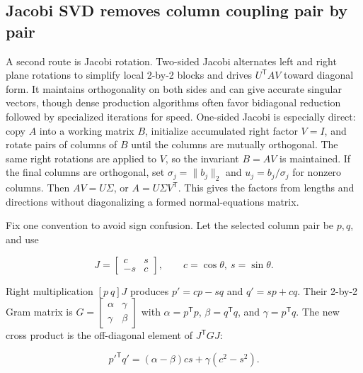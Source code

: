 \subsection{Jacobi SVD removes column coupling pair by pair}\label{jacobi-svd-removes-column-coupling-pair-by-pair}

A second route is Jacobi rotation. Two-sided Jacobi alternates left and right plane rotations to simplify local 2-by-2 blocks and drives \(U^\mathsf TAV\) toward diagonal form. It maintains orthogonality on both sides and can give accurate singular vectors, though dense production algorithms often favor bidiagonal reduction followed by specialized iterations for speed. One-sided Jacobi is especially direct: copy \(A\) into a working matrix \(B\), initialize accumulated right factor \(V=I\), and rotate pairs of columns of \(B\) until the columns are mutually orthogonal. The same right rotations are applied to \(V\), so the invariant \(B=AV\) is maintained. If the final columns are orthogonal, set \(\sigma_j=\|b_j\|_2\) and \(u_j=b_j/\sigma_j\) for nonzero columns. Then \(AV=U\Sigma\), or \(A=U\Sigma V^\mathsf T\). This gives the factors from lengths and directions without diagonalizing a formed normal-equations matrix.

Fix one convention to avoid sign confusion. Let the selected column pair be \(p,q\), and use

\[
J=\begin{bmatrix}c&s\\-s&c\end{bmatrix},\qquad c=\cos\theta,\ s=\sin\theta.
\]

Right multiplication \([p\ q]J\) produces \(p'=cp-sq\) and \(q'=sp+cq\). Their 2-by-2 Gram matrix is \(G=\begin{bmatrix}\alpha&\gamma\\\gamma&\beta\end{bmatrix}\) with \(\alpha=p^\mathsf Tp\), \(\beta=q^\mathsf Tq\), and \(\gamma=p^\mathsf Tq\). The new cross product is the off-diagonal element of \(J^\mathsf TGJ\):

\[
{p'}^\mathsf Tq'=(\alpha-\beta)cs+\gamma(c^2-s^2).
\]

